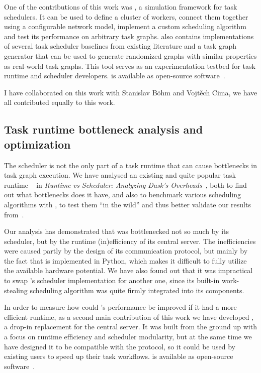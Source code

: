 One of the contributions of this work was \estee{}, a simulation framework for task
schedulers. It can be used to define a cluster of workers, connect them together using a
configurable network model, implement a custom scheduling algorithm and test its performance on
arbitrary task graphs. \estee{} also contains implementations of several task scheduler
baselines from existing literature and a task graph generator that can be used to generate
randomized graphs with similar properties as real-world task graphs. This tool serves as an
experimentation testbed for task runtime and scheduler developers. \estee{} is
available as open-source software~.

I have collaborated on this work with Stanislav Böhm and Vojtěch Cima, we have all contributed
equally to this work.

\subsection{Task runtime bottleneck analysis and optimization}
The scheduler is not the only part of a task runtime that can cause bottlenecks in task graph
execution. We have analysed an existing and quite popular task runtime \dask{}~\cite{dask} in
\emph{Runtime vs Scheduler: Analyzing Dask's Overheads}~\cite{rsds}, both to find out what
bottlenecks does it have, and also to benchmark various scheduling algorithms with \dask{},
to test them ``in the wild'' and thus better validate our results from~\cite{estee}.

Our analysis has demonstrated that \dask{} was bottlenecked not so much by its scheduler, but
by the runtime (in)efficiency of its central server. The inefficiencies were caused partly by
the design of its communication protocol, but mainly by the fact that \dask{} is implemented in
Python, which makes it difficult to fully utilize the available hardware potential. We have
also found out that it was impractical to swap \dask{}'s scheduler implementation for another one,
since its built-in work-stealing scheduling algorithm was quite firmly integrated into its
components.

In order to measure how could \dask{}'s performance be improved if it had a more efficient runtime,
as a second main contribution of this work we have developed \rsds{}, a drop-in
replacement for the \dask{} central server. It was built from the ground up with a focus on
runtime efficiency and scheduler modularity, but at the same time we have designed it to be
compatible with the \dask{} protocol, so it could be used by existing \dask{} users to speed up
their task workflows. \rsds{} is available as open-source
software~.

